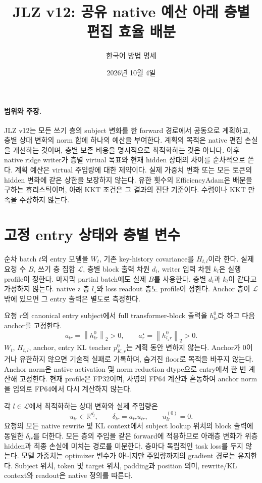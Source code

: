\documentclass[11pt]{article}
\title{JLZ v12: 공유 native 예산 아래 층별 편집 효율 배분}
\author{한국어 방법 명세}
\date{2026년 10월 4일}
\newcommand{\norm}[1]{\left\lVert #1\right\rVert}
\begin{document}
\maketitle

\paragraph{범위와 주장.}
JLZ v12는 모든 쓰기 층의 subject 변화를 한 forward 경로에서 공동으로
계획하고, 층별 상대 변화의 norm 합에 하나의 예산을 부여한다.
계획의 목적은 native 편집 손실을 개선하는 것이며, 층별 보존 비용을
명시적으로 최적화하는 것은 아니다. 이후 native ridge writer가 층별
virtual 목표와 현재 hidden 상태의 차이를 순차적으로 쓴다.
계획 예산은 virtual 주입량에 대한 제약이다. 실제 가중치 변화 또는
모든 토큰의 hidden 변화에 같은 상한을 보장하지 않는다.
유한 횟수의 EfficiencyAdam은 배분을 구하는 휴리스틱이며, 아래 KKT
조건은 그 결과의 진단 기준이다. 수렴이나 KKT 만족을 주장하지 않는다.

\section{고정 entry 상태와 층별 변수}
순차 batch $t$의 entry 모델을 $W_t$, 기존 key-history covariance를
$H_{t,l}$이라 한다. 실제 요청 수 $B$, 쓰기 층 집합 $\mathcal L$,
층별 block 출력 차원 $d_l$, writer 입력 차원 $k_l$은 실행 profile이
정한다. 마지막 partial batch에도 실제 $B$를 사용한다.
층별 $d_l$과 $k_l$이 같다고 가정하지 않는다.
native z 층 $l_\star$와 loss readout 층도 profile이 정한다.
Anchor 층이 $\mathcal L$ 밖에 있으면 그 entry 출력은 별도로 측정한다.

요청 $r$의 canonical entry subject에서 full transformer-block 출력을
$h^0_{lr}$라 하고 다음 anchor를 고정한다.
\begin{equation}
 a_{lr}=\norm{h^0_{lr}}_2>0,\qquad
 a^\star_r=\norm{h^0_{l_\star r}}_2>0.
 \label{eq:anchors}
\end{equation}
$W_t$, $H_{t,l}$, anchor, entry KL teacher $p^0_{K,r}$는 계획 동안
변하지 않는다. Anchor가 0이거나 유한하지 않으면 기술적 실패로
기록하며, 숨겨진 floor로 목적을 바꾸지 않는다.
Anchor norm은 native activation 및 norm reduction dtype으로 entry에서
한 번 계산해 고정한다. 현재 profile은 FP32이며, 사영의 FP64 계산과
혼동하여 anchor norm을 임의로 FP64에서 다시 계산하지 않는다.

각 $l\in\mathcal L$에서 최적화하는 상대 변화와 실제 주입량은
\begin{equation}
 u_{lr}\in\mathbb R^{d_l},\qquad
 \delta_{lr}=a_{lr}u_{lr},\qquad u^{(0)}_{lr}=0.
 \label{eq:parameterization}
\end{equation}
요청의 모든 native rewrite 및 KL context에서 subject lookup 위치의
block 출력에 동일한 $\delta_{lr}$를 더한다. 모든 층의 주입을 같은
forward에 적용하므로 아래층 변화가 위층 hidden과 최종 손실에 미치는
경로를 미분한다. 층마다 독립적인 task loss를 두지 않는다.
모델 가중치는 optimizer 변수가 아니지만 주입량까지의 gradient 경로는
유지한다. Subject 위치, token 및 target 위치, padding과 position 의미,
rewrite/KL context와 readout은 native 정의를 따른다.
\end{document}
